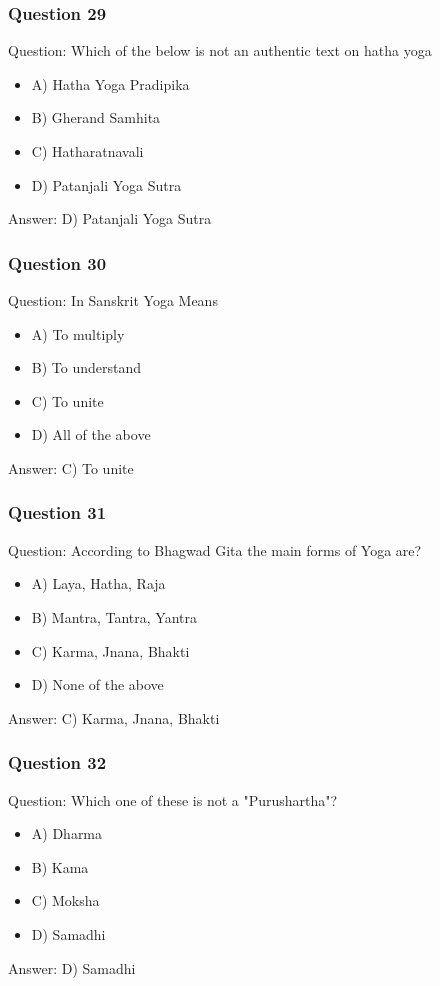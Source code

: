 \begin{frame}[fragile]\frametitle{Question 29}
Question: Which of the below is not an authentic text on hatha yoga
\begin{itemize}
\item A) Hatha Yoga Pradipika
\item B) Gherand Samhita
\item C) Hatharatnavali
\item D) Patanjali Yoga Sutra
\end{itemize}
Answer: D) Patanjali Yoga Sutra
\end{frame}

\begin{frame}[fragile]\frametitle{Question 30}
Question: In Sanskrit Yoga Means
\begin{itemize}
\item A) To multiply
\item B) To understand
\item C) To unite
\item D) All of the above
\end{itemize}
Answer: C) To unite
\end{frame}

\begin{frame}[fragile]\frametitle{Question 31}
Question: According to Bhagwad Gita the main forms of Yoga are?
\begin{itemize}
\item A) Laya, Hatha, Raja
\item B) Mantra, Tantra, Yantra
\item C) Karma, Jnana, Bhakti
\item D) None of the above
\end{itemize}
Answer: C) Karma, Jnana, Bhakti
\end{frame}

\begin{frame}[fragile]\frametitle{Question 32}
Question: Which one of these is not a "Purushartha"?
\begin{itemize}
\item A) Dharma
\item B) Kama
\item C) Moksha
\item D) Samadhi
\end{itemize}
Answer: D) Samadhi
\end{frame}

